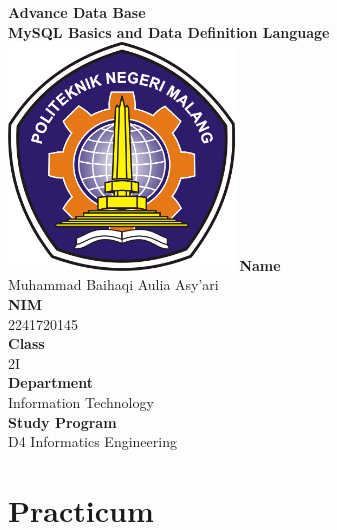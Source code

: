 \documentclass[12pt,titlepage]{article}
\newcommand{\vSubject}{Advance Data Base}
\newcommand{\vSubtitle}{MySQL Basics and Data Definition Language}
\newcommand{\vName}{Muhammad Baihaqi Aulia Asy'ari}
\newcommand{\vNIM}{2241720145}
\newcommand{\vClass}{2I}
\newcommand{\vDepartment}{Information Technology}
\newcommand{\vStudyProgram}{D4 Informatics Engineering}
\begin{document}
\begin{titlepage}
    \centering
    \vfill
    {\bfseries\LARGE
        \vSubject\\
        \vskip0.25cm
        \vSubtitle
    }
    \vfill
    \includegraphics[width=6cm]{images/polinema-logo.png}
    \vfill
    {
        \textbf{Name}\\
        \vName\\
        \vskip0.5cm
        \textbf{NIM}\\
        \vNIM\\
        \vskip0.5cm
        \textbf{Class}\\
        \vClass\\
        \vskip0.5cm
        \textbf{Department}\\
        \vDepartment\\
        \vskip0.5cm
        \textbf{Study Program}\\
        \vStudyProgram
    }
\end{titlepage}

\newpage

\section*{Practicum}
\end{document}
